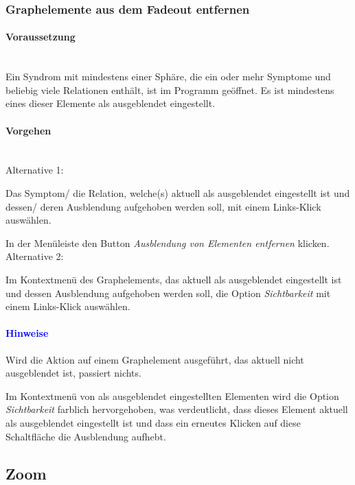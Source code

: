 \documentclass[enabledeprecatedfontcommands,fontsize=11pt,paper=a4,twoside]{scrartcl}
\newcounter{one}
\newcounter{two}[one]
\newcommand*{\hint}{\paragraph{\textcolor{blue}{Hinweise}}}
\newcommand*{\condition}{\paragraph{Voraussetzung}$\;$ \vspace{0.2cm}\\}
\newcommand*{\actions}{\paragraph{Vorgehen} $\;$\vspace{0.2cm}\\}
\newcommand*{\aOne}{\textcolor{bbe}{Alternative 1:}}
\newcommand*{\aTwo}{\textcolor{bbe}{Alternative 2:}}
\let\tempone\itemize
\let\temptwo\enditemize
\renewenvironment{itemize}{\tempone\addtolength{\itemsep}{-10.0pt}}{\temptwo}
\let\origenumerate\enumerate
\let\origendenumerate\endenumerate
\renewenvironment{enumerate}{\origenumerate \addtolength{\itemsep}{-10.0pt}}{\origendenumerate}
\begin{document}
\subsubsection{Graphelemente aus dem Fadeout entfernen}
		\condition 	
		Ein Syndrom mit mindestens einer Sphäre, die ein oder mehr Symptome und beliebig viele Relationen enthält, ist im Programm geöffnet. Es ist mindestens eines dieser Elemente als ausgeblendet eingestellt.
		\actions
		\aOne
		\begin{enumerate}
			\item Das Symptom/ die Relation, welche(s) aktuell als ausgeblendet eingestellt ist und dessen/ deren Ausblendung aufgehoben werden soll, mit einem Links-Klick auswählen. 
			\item In der Menüleiste den Button \textit{Ausblendung von Elementen entfernen} klicken.
		\end{enumerate}
		\aTwo
		\begin{enumerate}
			\item Im Kontextmenü des Graphelements, das aktuell als ausgeblendet eingestellt ist und dessen Ausblendung aufgehoben werden soll, die Option \textit{Sichtbarkeit} mit einem Links-Klick auswählen.
		\end{enumerate}
		\hint
		\begin{itemize}
				\item Wird die Aktion auf einem Graphelement ausgeführt, das aktuell nicht ausgeblendet ist, passiert nichts.
				\item Im Kontextmenü von als ausgeblendet eingestellten Elementen wird die Option \textit{Sichtbarkeit} farblich hervorgehoben, was verdeutlicht, dass dieses Element aktuell als ausgeblendet eingestellt ist und dass ein erneutes Klicken auf diese Schaltfläche die Ausblendung aufhebt.\\
		\end{itemize}	
		
\subsection{Zoom} \label{zoom}
\end{document}
